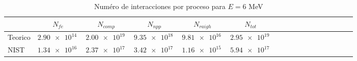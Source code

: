 \begin{table}
\caption{Numéro de interacciones por proceso para $E=6$ MeV}
\begin{tabular}{lcccccccccccccccc}
\toprule
 & $N_{fe}$ & $N_{comp}$  & $N_{npp}$  & $N_{raigh}$ & $N_{tot}$ \\
\midrule
Teorico & $\SI{2.90e+14}{}$ & $\SI{2.00e+19}{}$ & $\SI{9.35e+18}{}$ & $\SI{9.81e+16}{}$ & $\SI{2.95e+19}{}$ \\
NIST & $\SI{1.34e+16}{}$ & $\SI{2.37e+17}{}$ & $\SI{3.42e+17}{}$ & $\SI{1.16e+15}{}$ & $\SI{5.94e+17}{}$ \\
\bottomrule
\end{tabular}
\end{table}
